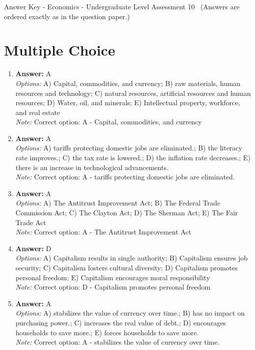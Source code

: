 \documentclass[12pt]{article}
\begin{document}
\begin{center}
Answer Key - Economics - Undergraduate Level Assessment 10 \
\small (Answers are ordered exactly as in the question paper.)
\end{center}

\section*{Multiple Choice}
\begin{enumerate}[label=\arabic*.]
\item \textbf{Answer:} A
\\ \textit{Options:} A) Capital, commodities, and currency; B) raw materials, human resources and technology; C) natural resources, artificial resources and human resources; D) Water, oil, and minerals; E) Intellectual property, workforce, and real estate
\\ \textit{Note:} Correct option: A - Capital, commodities, and currency
\item \textbf{Answer:} A
\\ \textit{Options:} A) tariffs protecting domestic jobs are eliminated.; B) the literacy rate improves.; C) the tax rate is lowered.; D) the inflation rate decreases.; E) there is an increase in technological advancements.
\\ \textit{Note:} Correct option: A - tariffs protecting domestic jobs are eliminated.
\item \textbf{Answer:} A
\\ \textit{Options:} A) The Antitrust Improvement Act; B) The Federal Trade Commission Act; C) The Clayton Act; D) The Sherman Act; E) The Fair Trade Act
\\ \textit{Note:} Correct option: A - The Antitrust Improvement Act
\item \textbf{Answer:} D
\\ \textit{Options:} A) Capitalism results in single authority; B) Capitalism ensures job security; C) Capitalism fosters cultural diversity; D) Capitalism promotes personal freedom; E) Capitalism encourages moral responsibility
\\ \textit{Note:} Correct option: D - Capitalism promotes personal freedom
\item \textbf{Answer:} A
\\ \textit{Options:} A) stabilizes the value of currency over time.; B) has no impact on purchasing power.; C) increases the real value of debt.; D) encourages households to save more.; E) forces households to save more.
\\ \textit{Note:} Correct option: A - stabilizes the value of currency over time.
\end{enumerate}
\end{document}
